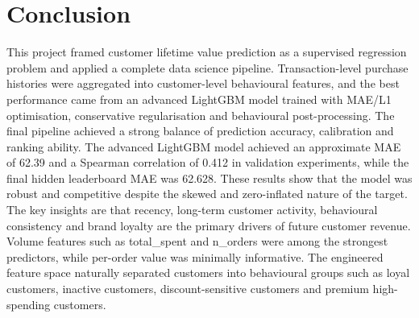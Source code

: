 \section{Conclusion}
This project framed customer lifetime value prediction as a supervised regression problem and applied a complete data science pipeline. Transaction-level purchase histories were aggregated into customer-level behavioural features, and the best performance came from an advanced LightGBM model trained with MAE/L1 optimisation, conservative regularisation and behavioural post-processing.
The final pipeline achieved a strong balance of prediction accuracy, calibration and ranking ability. The advanced LightGBM model achieved an approximate MAE of 62.39 and a Spearman correlation of 0.412 in validation experiments, while the final hidden leaderboard MAE was 62.628. These results show that the model was robust and competitive despite the skewed and zero-inflated nature of the target.
The key insights are that recency, long-term customer activity, behavioural consistency and brand loyalty are the primary drivers of future customer revenue. Volume features such as total\_spent and n\_orders were among the strongest predictors, while per-order value was minimally informative. The engineered feature space naturally separated customers into behavioural groups such as loyal customers, inactive customers, discount-sensitive customers and premium high-spending customers.
